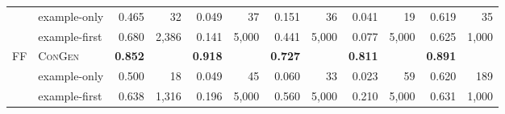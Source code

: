 \begin{tabular}{llrrrrrrrrrr}
 & example-only & 0.465 & 32 & 0.049 & 37 & 0.151 & 36 & 0.041 & 19 & 0.619 & 35 \\
 & example-first & 0.680 & 2{,}386 & 0.141 & 5{,}000 & 0.441 & 5{,}000 & 0.077 & 5{,}000 & 0.625 & 1{,}000 \\
\midrule
\multirow{3}{*}{FF} & \textsc{ConGen} & \textbf{0.852} &  & \textbf{0.918} &  & \textbf{0.727} &  & \textbf{0.811} &  & \textbf{0.891} &  \\
 & example-only & 0.500 & 18 & 0.049 & 45 & 0.060 & 33 & 0.023 & 59 & 0.620 & 189 \\
 & example-first & 0.638 & 1{,}316 & 0.196 & 5{,}000 & 0.560 & 5{,}000 & 0.210 & 5{,}000 & 0.631 & 1{,}000 \\
\bottomrule
\end{tabular}
